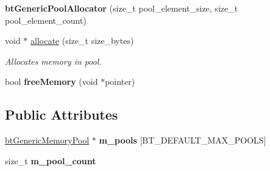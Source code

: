 \begin{DoxyCompactItemize}
{\bfseries bt\+Generic\+Pool\+Allocator} (size\+\_\+t pool\+\_\+element\+\_\+size, size\+\_\+t pool\+\_\+element\+\_\+count)
\item 
void $\ast$ \hyperlink{classbtGenericPoolAllocator_a621df0fb459af951d8a2eeda361a8691}{allocate} (size\+\_\+t size\+\_\+bytes)
\begin{DoxyCompactList}\small\item\em Allocates memory in pool. \end{DoxyCompactList}\item 
\mbox{\label{classbtGenericPoolAllocator_a6904f973aef630798a87f0e6dd37e93c}} 
bool {\bfseries free\+Memory} (void $\ast$pointer)
\end{DoxyCompactItemize}
\subsection*{Public Attributes}
\begin{DoxyCompactItemize}
\item 
\mbox{\label{classbtGenericPoolAllocator_ab5db5df5dc84cc72a69e0e09e53f235a}} 
\hyperlink{classbtGenericMemoryPool}{bt\+Generic\+Memory\+Pool} $\ast$ {\bfseries m\+\_\+pools} \mbox{[}B\+T\+\_\+\+D\+E\+F\+A\+U\+L\+T\+\_\+\+M\+A\+X\+\_\+\+P\+O\+O\+LS\mbox{]}
\item 
\mbox{\label{classbtGenericPoolAllocator_a683e472dcc9efbc63a9218ba2e1a4dc4}} 
size\+\_\+t {\bfseries m\+\_\+pool\+\_\+count}
\end{DoxyCompactItemize}
